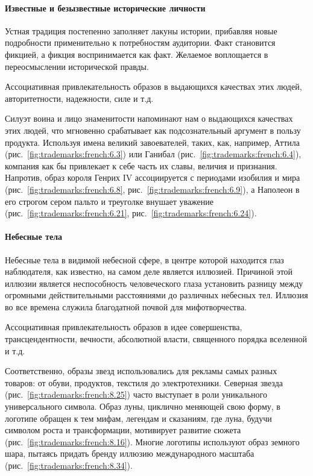 \paragraph{Известные и безызвестные исторические личности}

Устная традиция постепенно заполняет лакуны истории, прибавляя новые подробности
применительно к потребностям аудитории. Факт становится фикцией, а
фикция воспринимается как факт. Желаемое воплощается в переосмыслении
исторической правды.

Ассоциативная привлекательность образов в выдающихся качествах этих людей,
авторитетности, надежности, силе и т.д.

Силуэт воина и лицо знаменитости напоминают нам о выдающихся качествах этих людей,
что мгновенно срабатывает как подсознательный аргумент в пользу продукта.
Используя имена великий завоевателей, таких, как, например, Аттила
(рис.~\ref{fig:trademarks:french:6.3}) или
Ганибал (рис.~\ref{fig:trademarks:french:6.4}), компания как бы привлекает к себе часть их славы,
величия и признания. Напротив, образ короля Генрих IV ассоциируется с
периодами изобилия и мира (рис.~\ref{fig:trademarks:french:6.8}, рис.~\ref{fig:trademarks:french:6.9}), а Наполеон в его строгом сером пальто и треуголке
внушает уважение (рис.~\ref{fig:trademarks:french:6.21}, рис.~\ref{fig:trademarks:french:6.24}).

\paragraph{Небесные тела}

Небесные тела в видимой небесной сфере, в центре которой находится глаз
наблюдателя, как известно, на самом деле является иллюзией. Причиной этой
иллюзии является неспособность человеческого глаза установить разницу между
огромными действительными расстояниями до различных небесных тел. Иллюзия во все
времена служила благодатной почвой для мифотворчества.

Ассоциативная привлекательность образов в идее совершенства, трансцендентности,
вечности, абсолютной власти, священного порядка вселенной и т.д.

Соответственно, образы звезд использовались для рекламы самых разных товаров:
от обуви, продуктов, текстиля до электротехники. Северная звезда (рис.~\ref{fig:trademarks:french:8.25})
часто выступает в роли уникального универсального символа. Образ луны, циклично
меняющей свою форму, в логотипе обращен к тем мифам, легендам и сказаниям, где луна,
будучи символом роста и трансформации, мотивирует развитие сюжета
(рис.~\ref{fig:trademarks:french:8.16}). Многие логотипы используют образ
земного шара,
пытаясь придать бренду иллюзию международного масштаба (рис.~\ref{fig:trademarks:french:8.34}).

